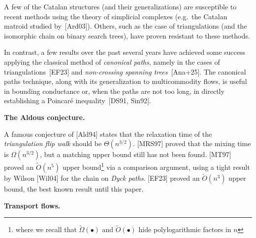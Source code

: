 \documentclass[10pt,a4paper]{article}
\begin{document}
A few of the Catalan structures (and their generalizations) are susceptible to recent methods using the theory of simplicial complexes (e.g. the Catalan matroid studied by [Ard03]). Others, such as the case of triangulations (and the isomorphic chain on binary search trees), have proven resistant to these methods.\par




In contrast, a few results over the past several years have achieved some success applying the classical method of \emph{canonical paths}, namely in the cases of triangulations [EF23] and \emph{non-crossing spanning trees} [Ana+25].
The canonical paths technique, along with its generalization to multicommodity flows, is useful in bounding conductance or, when the paths are not too long, in directly establishing a Poincaré inequality [DS91, Sin92].\par





\par\medskip\noindent\textbf{The Aldous conjecture.}\par




A famous conjecture of [Ald94] states that the relaxation time of the \emph{triangulation flip walk} should be $\Theta(n^{3/2})$. [MRS97] proved that the mixing time is $\Omega(n^{3/2})$, but a matching upper bound still has not been found. [MT97] proved an $\widetilde{O}(n^{5})$ upper bound\footnote{
              
              
              
              
              
              
              
              
            where we recall that $\widetilde{\Omega}(\bullet)$ and $\widetilde{O}(\bullet)$ hide polylogarithmic factors in $n$} via a comparison argument, using a tight result by Wilson [Wil04] for the chain on \emph{Dyck paths}. [EF23] proved an $\widetilde{O}(n^{3})$ upper bound, the best known result until this paper.\par





\par\medskip\noindent\textbf{Transport flows.}\par
\end{document}
